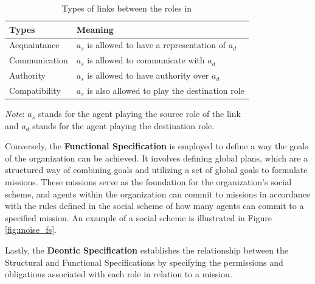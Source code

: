 \def \sourceagent{$a_s$ }
\def \destagent{$a_d$ }

\begin{table}[!htbp]
    \begin{minipage}{\columnwidth}
        \centering
        \begin{tabular}{l l}
            \toprule
            Types         & Meaning                                                        \\
            \midrule
            Acquaintance  & \sourceagent is allowed to have a representation of \destagent \\
            Communication & \sourceagent is allowed to communicate with \destagent         \\
            Authority     & \sourceagent is allowed to have authority over \destagent      \\
            Compatibility & \sourceagent is also allowed to play the destination role      \\
            \bottomrule
        \end{tabular}
        \begin{center}
            \footnotesize
            \emph{Note}: \sourceagent stands for the agent playing the source role of the link \\
            and \destagent stands for the agent playing the destination role. \\
        \end{center}
    \end{minipage}
    \caption{Types of links between the roles in \MOISEp}
    \label{tab:types_of_links_in_moise}
\end{table}

Conversely, the \textbf{Functional Specification} is employed to define a way the goals of the organization can be achieved. It involves defining global plans, which are a structured way of combining goals and utilizing a set of global goals to formulate missions. These missions serve as the foundation for the organization's social scheme, and agents within the organization can commit to missions in accordance with the rules defined in the social scheme of how many agents can commit to a specified mission. An example of a social scheme is illustrated in Figure \ref{fig:moise_fs}.

Lastly, the \textbf{Deontic Specification} establishes the relationship between the Structural and Functional Specifications by specifying the permissions and obligations associated with each role in relation to a mission.

